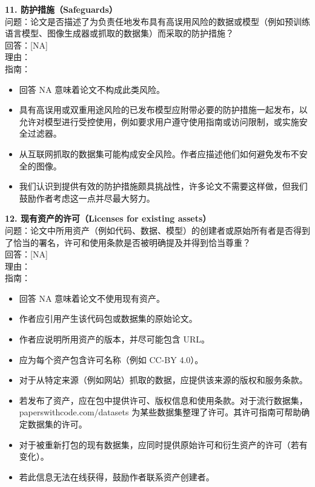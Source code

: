\documentclass[11pt,UTF8,fontset=fandol]{ctexart}
\begin{document}
\textbf{11. 防护措施（Safeguards）}\\
问题：论文是否描述了为负责任地发布具有高误用风险的数据或模型（例如预训练语言模型、图像生成器或抓取的数据集）而采取的防护措施？\\
回答：[NA]\\
理由：\\
指南：
\begin{itemize}[leftmargin=1.5em,itemsep=1pt]
\item 回答 NA 意味着论文不构成此类风险。
\item 具有高误用或双重用途风险的已发布模型应附带必要的防护措施一起发布，以允许对模型进行受控使用，例如要求用户遵守使用指南或访问限制，或实施安全过滤器。
\item 从互联网抓取的数据集可能构成安全风险。作者应描述他们如何避免发布不安全的图像。
\item 我们认识到提供有效的防护措施颇具挑战性，许多论文不需要这样做，但我们鼓励作者考虑这一点并尽最大努力。
\end{itemize}

\textbf{12. 现有资产的许可（Licenses for existing assets）}\\
问题：论文中所用资产（例如代码、数据、模型）的创建者或原始所有者是否得到了恰当的署名，许可和使用条款是否被明确提及并得到恰当尊重？\\
回答：[NA]\\
理由：\\
指南：
\begin{itemize}[leftmargin=1.5em,itemsep=1pt]
\item 回答 NA 意味着论文不使用现有资产。
\item 作者应引用产生该代码包或数据集的原始论文。
\item 作者应说明所用资产的版本，并尽可能包含 URL。
\item 应为每个资产包含许可名称（例如 CC-BY 4.0）。
\item 对于从特定来源（例如网站）抓取的数据，应提供该来源的版权和服务条款。
\item 若发布了资产，应在包中提供许可、版权信息和使用条款。对于流行数据集，paperswithcode.com/datasets 为某些数据集整理了许可。其许可指南可帮助确定数据集的许可。
\item 对于被重新打包的现有数据集，应同时提供原始许可和衍生资产的许可（若有变化）。
\item 若此信息无法在线获得，鼓励作者联系资产创建者。
\end{itemize}
\end{document}
